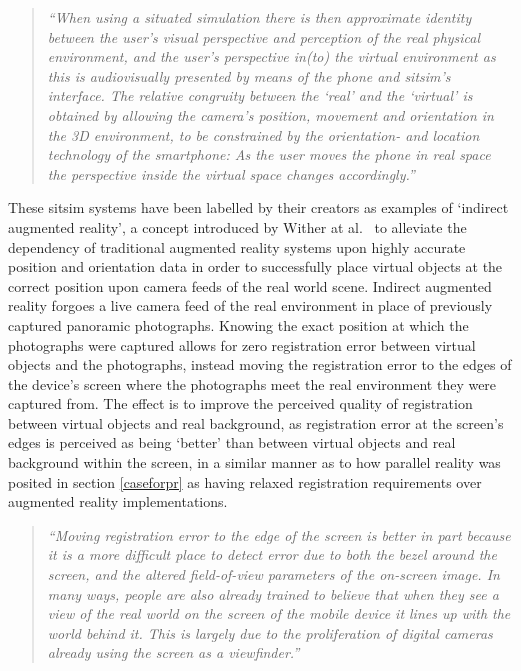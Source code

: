 \begin{quote}
	\textit{``When using a situated simulation there is then approximate identity between the user’s visual perspective and perception of the real physical environment, and the user’s perspective in(to) the virtual environment as this is audiovisually presented by means of the phone and sitsim’s interface. The relative congruity between the `real' and the `virtual' is obtained by allowing the camera’s position, movement and orientation in the 3D environment, to be constrained by the orientation- and location technology of the smartphone: As the user moves the phone in real space the perspective inside the virtual space changes accordingly.''}~\cite{Liestøl2011}
\end{quote}

These sitsim systems have been labelled by their creators as examples of `indirect augmented reality', a concept introduced by Wither at al.~\cite{Wither2011} to alleviate the dependency of traditional augmented reality systems upon highly accurate position and orientation data in order to successfully place virtual objects at the correct position upon camera feeds of the real world scene. Indirect augmented reality forgoes a live camera feed of the real environment in place of previously captured panoramic photographs. Knowing the exact position at which the photographs were captured allows for zero registration error between virtual objects and the photographs, instead moving the registration error to the edges of the device's screen where the photographs meet the real environment they were captured from. The effect is to improve the perceived quality of registration between virtual objects and real background, as registration error at the screen's edges is perceived as being `better' than between virtual objects and real background within the screen, in a similar manner as to how parallel reality was posited in section \ref{caseforpr} as having relaxed registration requirements over augmented reality implementations.

\begin{quote}
	\textit{``Moving registration error to the edge of the screen is better in part because it is a more difficult place to detect error due to both the bezel around the screen, and the altered field-of-view parameters of the on-screen image. In many ways, people are also already trained to believe that when they see a view of the real world on the screen of the mobile device it lines up with the world behind it. This is largely due to the proliferation of digital cameras already using the screen as a viewfinder.''}~\cite{Wither2011}
\end{quote}

